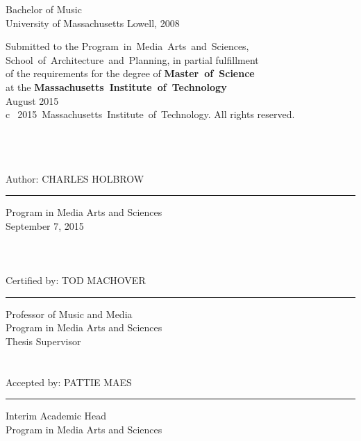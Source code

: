 
\noindent Bachelor of Music\\
\noindent University of Massachusetts Lowell, 2008\\

\vspace{30mm}

\begin{raggedright}
\noindent Submitted to the Program~in~Media~Arts~and~Sciences,\\
School~of~Architecture~and~Planning, in partial fulfillment\\
of the requirements for the degree of \textbf{Master~of~Science}\\
at the \textbf{Massachusetts~Institute~of~Technology} \\
\noindent August 2015\\
\noindent \textcircled{c}~2015~Massachusetts~Institute~of~Technology. All rights reserved. \\
\end{raggedright}

\begin{fullwidth}
\mbox{ }\\
\mbox{ }\\
\mbox{ }\\


\noindent Author: \hfill CHARLES HOLBROW\vspace{3pt}\hrule\vspace{6pt}
\flushright Program in Media Arts and Sciences\\
\flushright September 7, 2015\\
\mbox{ }\\
\mbox{ }\\
\mbox{ }\\
 
\noindent Certified by: \hfill TOD MACHOVER\vspace{3pt}\hrule\vspace{6pt}
Professor of Music and Media\\
Program in Media Arts and Sciences\\
Thesis Supervisor\\
\mbox{ }\\ 
\mbox{ }\\

\noindent Accepted by: \hfill PATTIE MAES\vspace{3pt}\hrule\vspace{6pt}
Interim Academic Head\\
Program in Media Arts and Sciences\\

\thispagestyle{empty}  %
\end{fullwidth}
 
